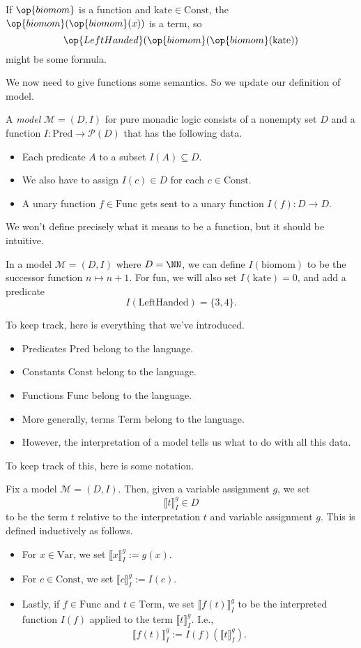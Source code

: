 \begin{ex}
	If $\op{biomom}$ is a function and $\mathrm{kate}\in\mathrm{Const}$, the $\op{biomom}(\op{biomom}(x))$ is a term, so
	\[\op{LeftHanded}(\op{biomom}(\op{biomom}(\mathrm{kate}))\]
	might be some formula.
\end{ex}
We now need to give functions some semantics. So we update our definition of model.
\begin{defihelper}[Model]
	A \textit{model} $\mathcal M=(D,I)$ for pure monadic logic consists of a nonempty set $D$ and a function $I:\mathrm{Pred}\to\mathcal P(D)$ that has the following data.
	\begin{itemize}
		\item Each predicate $A$ to a subset $I(A)\subseteq D$.
		\item We also have to assign $I(c)\in D$ for each $c\in\mathrm{Const}$.
		\item A unary function $f\in\mathrm{Func}$ gets sent to a unary function $I(f):D\to D$.
	\end{itemize}
\end{defihelper}
We won't define precisely what it means to be a function, but it should be intuitive.
\begin{example} \label{ex:kate}
	In a model $\mathcal M=(D,I)$ where $D=\NN$, we can define $I(\mathrm{biomom})$ to be the successor function $n\mapsto n+1$. For fun, we will also set $I(\mathrm{kate})=0$, and add a predicate
	\[I(\mathrm{LeftHanded})=\{3,4\}.\]
\end{example}
To keep track, here is everything that we've introduced.
\begin{itemize}
	\item Predicates $\mathrm{Pred}$ belong to the language.
	\item Constants $\mathrm{Const}$ belong to the language.
	\item Functions $\mathrm{Func}$ belong to the language.
	\item More generally, terms $\mathrm{Term}$ belong to the language.
	\item However, the interpretation of a model tells us what to do with all this data.
\end{itemize}
To keep track of this, here is some notation.
\begin{defi}[Denotation]
	Fix a model $\mathcal M=(D,I)$. Then, given a variable assignment $g$, we set
	\[\llbracket t\rrbracket_I^g\in D\]
	to be the term $t$ relative to the interpretation $t$ and variable assignment $g$. This is defined inductively as follows.
	\begin{itemize}
		\item For $x\in\mathrm{Var}$, we set $\llbracket x\rrbracket_I^g:=g(x)$.
		\item For $c\in\mathrm{Const}$, we set $\llbracket c\rrbracket_I^g:=I(c)$.
		\item Lastly, if $f\in\mathrm{Func}$ and $t\in\mathrm{Term}$, we set $\llbracket f(t)\rrbracket_I^g$ to be the interpreted function $I(f)$ applied to the term $\llbracket t\rrbracket_I^g$. I.e.,
		\[\llbracket f(t)\rrbracket_I^g:=I(f)(\llbracket t\rrbracket_I^g).\]
	\end{itemize}
\end{defi}
